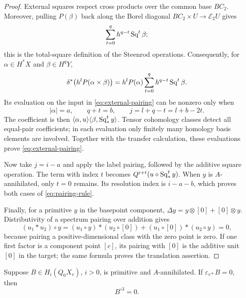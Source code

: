 \begin{proof}
External squares respect cross products over the common base $BC_2$.
Moreover, pulling $P(\beta)$ back along the Borel diagonal
$BC_2\times U\to\mathcal E_2U$ gives
\[
 \sum_{t=0}^{q}h^{q-t}\operatorname{Sq}^t\beta;
\]
this is the total-square definition of the Steenrod operations.
Consequently, for $\alpha\in H^*X$ and $\beta\in H^qY$,
\[
 \delta^*\bigl(h^lP(\alpha\times\beta)\bigr)
 =h^lP(\alpha)\sum_{t=0}^{q}h^{q-t}\operatorname{Sq}^t\beta.
\]
Its evaluation on the input in \eqref{eq:external-pairing} can be
nonzero only when
\[
 |\alpha|=a,\qquad q+t=b,\qquad j=l+q-t=l+b-2t.
\]
The coefficient is then
$\langle\alpha,u\rangle\langle\beta,\operatorname{Sq}_*^t y\rangle$.
Tensor cohomology classes detect all equal-pair coefficients; in each
evaluation only finitely many homology basis elements are involved.
Together with the transfer calculation, these evaluations prove
\eqref{eq:external-pairing}.

Now take $j=i-a$ and apply the label pairing, followed by the additive
square operation.  The term with index $t$ becomes
$Q^{i+t}(u\circ\operatorname{Sq}_*^t y)$.  When $y$ is $A$-annihilated, only $t=0$
remains.  Its resolution index is $i-a-b$, which proves both cases of
\eqref{eq:pairing-rule}.

Finally, for a primitive $y$ in the basepoint component,
$\Delta y=y\otimes[0]+[0]\otimes y$.  Distributivity of a spectrum
pairing over addition gives
\[
 (u_1*u_2)\circ y
 =(u_1\circ y)*(u_2\circ[0])
  +(u_1\circ[0])*(u_2\circ y)=0,
\]
because pairing a positive-dimensional class with the zero point is
zero.  If one first factor is a component point $[c]$, its pairing
with $[0]$ is the additive unit $[0]$ in the target; the same formula
proves the translation assertion.
\end{proof}

\begin{lemma}
\label{lem:block-nilpotence}
Suppose $B\in H_i(Q_0X_v)$, $i>0$, is primitive and $A$-annihilated.
If $\varepsilon_{v*}B=0$, then
\[
 B^{\circ3}=0.
\]
\end{lemma}


